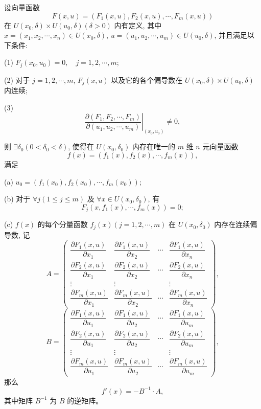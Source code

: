 \documentclass[12pt,fontset=fandol]{ctexart}
\begin{document}
\begin{theorem}[隐函数组存在定理]\label{course-theorem-14-4-3}\quad 设向量函数
\[
  F(x,u)=(F_1(x,u),F_2(x,u),\cdots,F_m(x,u))
\]
在 $U(x_0,\delta)\times U(u_0,\delta)(\delta>0)$ 内有定义, 其中 $x=(x_1,x_2,\cdots,x_n)\in U(x_0,\delta)$, $u=(u_1,u_2,\cdots,u_m)\in U(u_0,\delta)$, 并且满足以下条件:

(1) $F_j(x_0,u_0)=0,\quad j=1,2,\cdots,m$;

(2) 对于 $j=1,2,\cdots,m$, $F_j(x,u)$ 以及它的各个偏导数在 $U(x_0,\delta)\times U(u_0,\delta)$ 内连续;

(3)
\[
  \left.
  \frac{\partial(F_1,F_2,\cdots,F_m)}
  {\partial(u_1,u_2,\cdots,u_m)}
  \right|_{(x_0,u_0)}
  \ne0,
\]

则 $\exists\delta_0(0<\delta_0<\delta)$, 使得在 $U(x_0,\delta_0)$ 内存在唯一的 $m$ 维 $n$ 元向量函数
\[
  f(x)=(f_1(x),f_2(x),\cdots,f_m(x)),
\]
满足

(a) $u_0=(f_1(x_0),f_2(x_0),\cdots,f_m(x_0))$;

(b) 对于 $\forall j(1\leqslant j\leqslant m)$ 及 $\forall x\in U(x_0,\delta_0)$, 有
\[
  F_j(x,f_1(x),\cdots,f_m(x))=0;
\]

(c) $f(x)$ 的每个分量函数 $f_j(x)(j=1,2,\cdots,m)$ 在 $U(x_0,\delta_0)$ 内存在连续偏导数, 记
\[
  A=
  \begin{pmatrix}
    \dfrac{\partial F_1(x,u)}{\partial x_1} &
    \dfrac{\partial F_1(x,u)}{\partial x_2} &
    \cdots &
    \dfrac{\partial F_1(x,u)}{\partial x_n}\\
    \dfrac{\partial F_2(x,u)}{\partial x_1} &
    \dfrac{\partial F_2(x,u)}{\partial x_2} &
    \cdots &
    \dfrac{\partial F_2(x,u)}{\partial x_n}\\
    \vdots & \vdots & & \vdots\\
    \dfrac{\partial F_m(x,u)}{\partial x_1} &
    \dfrac{\partial F_m(x,u)}{\partial x_2} &
    \cdots &
    \dfrac{\partial F_m(x,u)}{\partial x_n}
  \end{pmatrix},
\]
\[
  B=
  \begin{pmatrix}
    \dfrac{\partial F_1(x,u)}{\partial u_1} &
    \dfrac{\partial F_1(x,u)}{\partial u_2} &
    \cdots &
    \dfrac{\partial F_1(x,u)}{\partial u_m}\\
    \dfrac{\partial F_2(x,u)}{\partial u_1} &
    \dfrac{\partial F_2(x,u)}{\partial u_2} &
    \cdots &
    \dfrac{\partial F_2(x,u)}{\partial u_m}\\
    \vdots & \vdots & & \vdots\\
    \dfrac{\partial F_m(x,u)}{\partial u_1} &
    \dfrac{\partial F_m(x,u)}{\partial u_2} &
    \cdots &
    \dfrac{\partial F_m(x,u)}{\partial u_m}
  \end{pmatrix},
\]
那么
\[
  f'(x)=-B^{-1}\cdot A,
\]
其中矩阵 $B^{-1}$ 为 $B$ 的逆矩阵。

\end{theorem}
\end{document}
